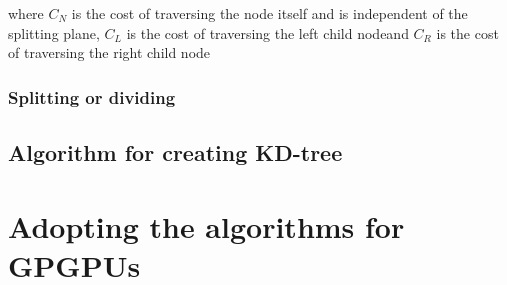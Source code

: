where $C_N$ is the cost of traversing the node itself and is
independent of the splitting plane, $C_L$ is the cost of traversing
the left child nodeand $C_R$ is the cost of traversing the right child
node



\subsubsection{Splitting or dividing}









\subsection{Algorithm for creating KD-tree}




\section{Adopting the algorithms for GPGPUs}




